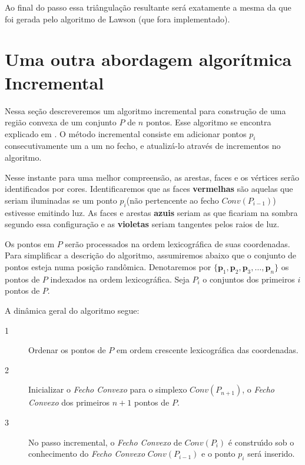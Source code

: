 \documentclass[12pt,a4paper]{book}
\begin{document}
Ao final do passo essa tri\^{a}ngula\c{c}\~{a}o resultante ser\'{a}
exatamente a mesma da que foi gerada pelo algoritmo de Lawson (que fora
implementado).

\section{Uma outra abordagem algor\'itmica Incremental}

Nessa se\c{c}\~{a}o descreveremos um  algoritmo incremental para constru\c{c}\~{a}o de uma regi\~{a}o convexa de um conjunto $P$ de $n$ pontos. Esse algoritmo se encontra explicado em \cite{boissonnat}. O m\'{e}todo incremental consiste em adicionar pontos $p_{i}$ consecutivamente um a um no fecho, e atualiz\'{a}-lo atrav\'{e}s de incrementos no algoritmo.

Nesse instante para uma melhor compreens\~{a}o, as arestas, faces e os v\'{e}rtices 
ser\~{a}o identificados por cores. Identificaremos que as faces \textbf{vermelhas} s\~{a}o aquelas que seriam iluminadas se um ponto $p_{i}$(n\~{a}o pertencente ao fecho $Conv(P_{i-1})$) estivesse emitindo luz. As faces e arestas \textbf{azuis} seriam as que ficariam na sombra segundo essa configura\c{c}\~{a}o e as \textbf{violetas} seriam tangentes pelos raios de luz. 

Os pontos em $P$ ser\~{a}o processados na ordem lexicogr\'{a}fica de suas coordenadas. Para simplificar a descri\c{c}\~{a}o do algoritmo, assumiremos abaixo que o conjunto de pontos esteja numa posi\c{c}\~{a}o rand\^{o}mica. Denotaremos por $\{\mathbf{p}_{1}, \mathbf{p}_{2}, \mathbf{p}_{3},\ldots, \mathbf{p}_{n}\}$ os pontos de $P$ indexados na ordem lexicogr\'{a}fica. Seja $P_{i}$ o conjuntos dos primeiros $i$ pontos de $P$.

A din\^{a}mica geral do algoritmo segue:

\begin{description}
\item[1] Ordenar os pontos de $P$ em ordem crescente lexicogr\'{a}fica das
coordenadas.
\end{description} 

\begin{description}
\item[2] Inicializar o \textit{Fecho Convexo} para o simplexo $Conv(P_{n+1})$, o \textit{Fecho Convexo}
dos primeiros $n+1$ pontos de $P$.
\end{description} 

\begin{description}
\item[3] No passo incremental, o \textit{Fecho Convexo} de $Conv(P_{i})$ \'{e} constru\'{\i}do sob o 
conhecimento do \textit{Fecho Convexo} $Conv(P_{i-1})$ e o ponto $p_{i}$ ser\'{a} inserido.
\end{description} 
\end{document}
